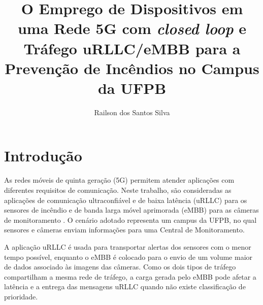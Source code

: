 \documentclass[12pt]{article}
\title{O Emprego de Dispositivos em uma Rede 5G com \textit{closed loop} e Tráfego uRLLC/eMBB para a Prevenção de Incêndios no Campus da UFPB}
\author{Railson dos Santos Silva\inst{1}}
\begin{document}
		\maketitle
		
		
		
		\section{Introdu\c{c}\~ao}

		As redes móveis de quinta geração (5G) permitem atender aplicações com diferentes requisitos de comunicação. Neste trabalho, são consideradas as aplicações de comunicação ultraconfiável e de baixa latência (uRLLC) para os sensores de incêndio e de banda larga móvel aprimorada (eMBB) para as câmeras de monitoramento \cite{3gpp23501,itu2017m2410}. O cenário adotado representa um campus da UFPB, no qual sensores e câmeras enviam informações para uma Central de Monitoramento.

		A aplicação uRLLC é usada para transportar alertas dos sensores com o menor tempo possível, enquanto o eMBB é colocado para o envio de um volume maior de dados associado às imagens das câmeras. Como os dois tipos de tráfego compartilham a mesma rede de tráfego, a carga gerada pelo eMBB pode afetar a latência e a entrega das mensagens uRLLC quando não existe classificação de prioridade.
\end{document}
